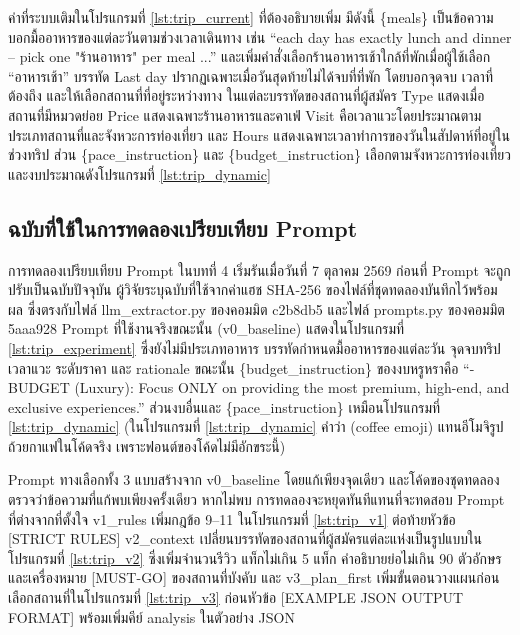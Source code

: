 ค่าที่ระบบเติมในโปรแกรมที่ \ref{lst:trip_current} ที่ต้องอธิบายเพิ่ม มีดังนี้ \{meals\} เป็นข้อความบอกมื้ออาหารของแต่ละวันตามช่วงเวลาเดินทาง เช่น ``each day has exactly lunch and dinner -- pick one "ร้านอาหาร" per meal ...'' และเพิ่มคำสั่งเลือกร้านอาหารเช้าใกล้ที่พักเมื่อผู้ใช้เลือก ``อาหารเช้า'' บรรทัด Last day ปรากฏเฉพาะเมื่อวันสุดท้ายไม่ได้จบที่ที่พัก โดยบอกจุดจบ เวลาที่ต้องถึง และให้เลือกสถานที่ที่อยู่ระหว่างทาง ในแต่ละบรรทัดของสถานที่ผู้สมัคร Type แสดงเมื่อสถานที่มีหมวดย่อย Price แสดงเฉพาะร้านอาหารและคาเฟ่ Visit คือเวลาแวะโดยประมาณตามประเภทสถานที่และจังหวะการท่องเที่ยว และ Hours แสดงเฉพาะเวลาทำการของวันในสัปดาห์ที่อยู่ในช่วงทริป ส่วน \{pace\_instruction\} และ \{budget\_instruction\} เลือกตามจังหวะการท่องเที่ยวและงบประมาณดังโปรแกรมที่ \ref{lst:trip_dynamic}



\subsection{ฉบับที่ใช้ในการทดลองเปรียบเทียบ Prompt}

การทดลองเปรียบเทียบ Prompt ในบทที่ 4 เริ่มรันเมื่อวันที่ 7 ตุลาคม 2569 ก่อนที่ Prompt จะถูกปรับเป็นฉบับปัจจุบัน ผู้วิจัยระบุฉบับที่ใช้จากค่าแฮช SHA-256 ของไฟล์ที่ชุดทดลองบันทึกไว้พร้อมผล ซึ่งตรงกับไฟล์ llm\_extractor.py ของคอมมิต c2b8db5 และไฟล์ prompts.py ของคอมมิต 5aaa928 Prompt ที่ใช้งานจริงขณะนั้น (v0\_baseline) แสดงในโปรแกรมที่ \ref{lst:trip_experiment} ซึ่งยังไม่มีประเภทอาหาร บรรทัดกำหนดมื้ออาหารของแต่ละวัน จุดจบทริป เวลาแวะ ระดับราคา และ rationale ขณะนั้น \{budget\_instruction\} ของงบหรูหราคือ ``- BUDGET (Luxury): Focus ONLY on providing the most premium, high-end, and exclusive experiences.'' ส่วนงบอื่นและ \{pace\_instruction\} เหมือนโปรแกรมที่ \ref{lst:trip_dynamic} (ในโปรแกรมที่ \ref{lst:trip_dynamic} คำว่า (coffee emoji) แทนอีโมจิรูปถ้วยกาแฟในโค้ดจริง เพราะฟอนต์ของโค้ดไม่มีอักขระนี้)



Prompt ทางเลือกทั้ง 3 แบบสร้างจาก v0\_baseline โดยแก้เพียงจุดเดียว และโค้ดของชุดทดลองตรวจว่าข้อความที่แก้พบเพียงครั้งเดียว หากไม่พบ การทดลองจะหยุดทันทีแทนที่จะทดสอบ Prompt ที่ต่างจากที่ตั้งใจ v1\_rules เพิ่มกฎข้อ 9--11 ในโปรแกรมที่ \ref{lst:trip_v1} ต่อท้ายหัวข้อ [STRICT RULES] v2\_context เปลี่ยนบรรทัดของสถานที่ผู้สมัครแต่ละแห่งเป็นรูปแบบในโปรแกรมที่ \ref{lst:trip_v2} ซึ่งเพิ่มจำนวนรีวิว แท็กไม่เกิน 5 แท็ก คำอธิบายย่อไม่เกิน 90 ตัวอักษร และเครื่องหมาย [MUST-GO] ของสถานที่บังคับ และ v3\_plan\_first เพิ่มขั้นตอนวางแผนก่อนเลือกสถานที่ในโปรแกรมที่ \ref{lst:trip_v3} ก่อนหัวข้อ [EXAMPLE JSON OUTPUT FORMAT] พร้อมเพิ่มคีย์ analysis ในตัวอย่าง JSON

